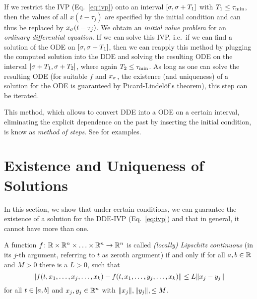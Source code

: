     If we restrict the IVP (Eq.~\ref{eq:ivp}) onto an interval $[\sigma,\sigma+T_1]$ with $T_1\leq\tau_{\min}$, then the values of all $x(t-\tau_j)$ are specified by the initial condition and can thus be replaced by $x_{\sigma}(t-\tau_j)$.
    We obtain an \emph{initial value problem} for an \emph{ordinary differential equation}.
    If we can solve this IVP, i.e.\ if we can find a solution of the ODE on $[\sigma,\sigma+T_1]$, then we can reapply this method by plugging the computed solution into the DDE and solving the resulting ODE on the interval $[\sigma+T_1,\sigma+T_2]$, where again $T_2\leq\tau_{\min}$. As long as one can solve the resulting ODE (for suitable $f$ and $x_{\sigma}$, the existence (and uniqueness) of a solution for the ODE is guaranteed by Picard-Lindelöf's theorem), this step can be iterated.

    This method, which allows to convert DDE into a ODE on a certain interval, eliminating the explicit dependence on the past by inserting the initial condition, is know as \emph{method of steps}.
    See \cite{Falbo06FDEs} for examples.



\section{Existence and Uniqueness of Solutions}
    \label{solutions-existence-uniqueness}

    In this section, we show that under certain conditions, we can guarantee the existence of a solution for the DDE-IVP (Eq.~\ref{eq:ivp}) and that in general, it cannot have more than one. 


    \begin{definition}\label{def:lipschitz}
        A function $f\colon\mathbb{R}\times\mathbb{R}^n\times\ldots\times\mathbb{R}^n\to\mathbb{R}^n$ is called \emph{(locally) Lipschitz continuous} (in its $j$-th argument, referring to $t$ as zeroth argument) if and only if for all $a,b\in\mathbb{R}$ and $M>0$ there is a $L>0$, such that
        \begin{equation*}
            \nnorm*{f(t,x_1,\ldots,x_j,\ldots,x_k) - f(t,x_1,\ldots,y_j,\ldots,x_k)} \leq L\nnorm*{x_j-y_j}
        \end{equation*}
        for all $t\in[a,b]$ and $x_j,y_j\in\mathbb{R}^n$ with $\lVert x_j\rVert,\lVert y_j\rVert,\leq M$.
    \end{definition}


